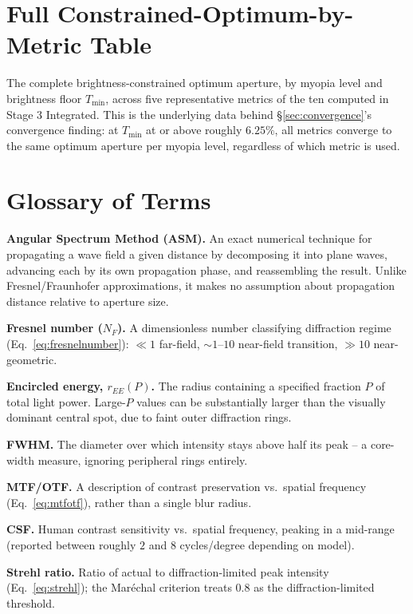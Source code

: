 \documentclass[11pt]{report}
\newcommand{\Tmin}{T_{\min}}
\begin{document}
\chapter{Full Constrained-Optimum-by-Metric Table}
\label{app:fulldata}
The complete brightness-constrained optimum aperture, by myopia level and brightness floor $\Tmin$, across five representative metrics of the ten computed in Stage 3 Integrated. This is the underlying data behind \S\ref{sec:convergence}'s convergence finding: at $\Tmin$ at or above roughly $6.25\%$, all metrics converge to the same optimum aperture per myopia level, regardless of which metric is used.



\chapter{Glossary of Terms}
\label{app:glossary}

\textbf{Angular Spectrum Method (ASM).} An exact numerical technique for propagating a wave field a given distance by decomposing it into plane waves, advancing each by its own propagation phase, and reassembling the result. Unlike Fresnel/Fraunhofer approximations, it makes no assumption about propagation distance relative to aperture size.

\textbf{Fresnel number ($N_F$).} A dimensionless number classifying diffraction regime (Eq.~\ref{eq:fresnelnumber}): $\ll 1$ far-field, $\sim1$--$10$ near-field transition, $\gg10$ near-geometric.

\textbf{Encircled energy, $r_{EE}(P)$.} The radius containing a specified fraction $P$ of total light power. Large-$P$ values can be substantially larger than the visually dominant central spot, due to faint outer diffraction rings.

\textbf{FWHM.} The diameter over which intensity stays above half its peak -- a core-width measure, ignoring peripheral rings entirely.

\textbf{MTF/OTF.} A description of contrast preservation vs.\ spatial frequency (Eq.~\ref{eq:mtfotf}), rather than a single blur radius.

\textbf{CSF.} Human contrast sensitivity vs.\ spatial frequency, peaking in a mid-range (reported between roughly $2$ and $8$ cycles/degree depending on model).

\textbf{Strehl ratio.} Ratio of actual to diffraction-limited peak intensity (Eq.~\ref{eq:strehl}); the Mar\'echal criterion treats $0.8$ as the diffraction-limited threshold.
\end{document}
